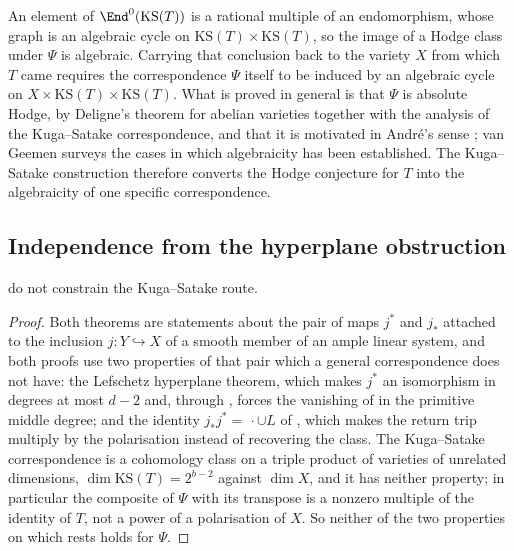 \begin{remark}%
\label{rem:kstransport}
An element of $\End^{0}(\mathrm{KS}(T))$ is a rational multiple of an
endomorphism, whose graph is an algebraic cycle on
$\mathrm{KS}(T)\times\mathrm{KS}(T)$, so the image of a Hodge class under
$\Psi$ is algebraic. Carrying that conclusion back to the variety $X$ from
which $T$ came requires the correspondence $\Psi$ itself to be induced by an
algebraic cycle on $X\times\mathrm{KS}(T)\times\mathrm{KS}(T)$. What is
proved in general is that $\Psi$ is absolute Hodge, by
Deligne's theorem for abelian varieties together with the analysis of the
Kuga--Satake correspondence, and that it is motivated in Andr\'e's sense
\cite{And96}; van Geemen \cite{vG00} surveys the cases in which algebraicity
has been established. The Kuga--Satake construction therefore converts the
Hodge conjecture for $T$ into the algebraicity of one specific
correspondence.
\end{remark}

\subsection{Independence from the hyperplane obstruction}

\begin{proposition}\label{prop:ksnotrestriction}
 do not constrain the Kuga--Satake route.
\end{proposition}

\begin{proof}
Both theorems are statements about the pair of maps $j^{*}$ and $j_{*}$
attached to the inclusion $j\colon Y\hookrightarrow X$ of a smooth member of an
ample linear system, and both proofs use two properties of that pair which a
general correspondence does not have: the Lefschetz hyperplane theorem, which
makes $j^{*}$ an isomorphism in degrees at most $d-2$ and, through
, forces the vanishing of  in
the primitive middle degree; and the identity $j_{*}j^{*}=\,\cdot\cup L$ of
, which makes the return trip multiply by the
polarisation instead of recovering the class. The Kuga--Satake
correspondence is a cohomology class on a triple product of varieties of
unrelated dimensions, $\dim\mathrm{KS}(T)=2^{b-2}$ against $\dim X$, and it has
neither property; in particular the composite of $\Psi$ with its transpose is
a nonzero multiple of the identity of $T$, not a power of a polarisation of
$X$. So
neither of the two properties on which  rests holds for
$\Psi$.
\end{proof}

